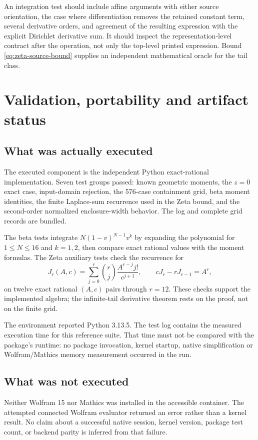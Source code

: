\documentclass[11pt,a4paper]{article}
\begin{document}
An integration test should include affine arguments with either source orientation, the case where differentiation removes the retained constant term, several derivative orders, and agreement of the resulting expression with the explicit Dirichlet derivative sum. It should inspect the representation-level contract after the operation, not only the top-level printed expression. Bound \eqref{eq:zeta-source-bound} supplies an independent mathematical oracle for the tail class.

\section{Validation, portability and artifact status}\label{sec:validation}

\subsection{What was actually executed}
The executed component is the independent Python exact-rational implementation. Seven test groups passed: known geometric moments, the $z=0$ exact case, input-domain rejection, the 576-case containment grid, beta moment identities, the finite Laplace-sum recurrence used in the Zeta bound, and the second-order normalized enclosure-width behavior. The log and complete grid records are bundled.

The beta tests integrate $N(1-v)^{N-1}v^k$ by expanding the polynomial for $1\leq N\leq16$ and $k=1,2$, then compare exact rational values with the moment formulas. The Zeta auxiliary tests check the recurrence for
\[
 J_r(A,c)=\sum_{j=0}^{r}\binom rj\frac{A^{r-j}j!}{c^{j+1}},
 \qquad cJ_r-rJ_{r-1}=A^r,
\]
on twelve exact rational $(A,c)$ pairs through $r=12$. These checks support the implemented algebra; the infinite-tail derivative theorem rests on the proof, not on the finite grid.

The environment reported Python 3.13.5. The test log contains the measured execution time for this reference suite. That time must not be compared with the package's runtime: no package invocation, kernel startup, native simplification or Wolfram/Mathics memory measurement occurred in the run.

\subsection{What was not executed}
Neither Wolfram 15 nor Mathics was installed in the accessible container. The attempted connected Wolfram evaluator returned an error rather than a kernel result. No claim about a successful native session, kernel version, package test count, or backend parity is inferred from that failure.
\end{document}
